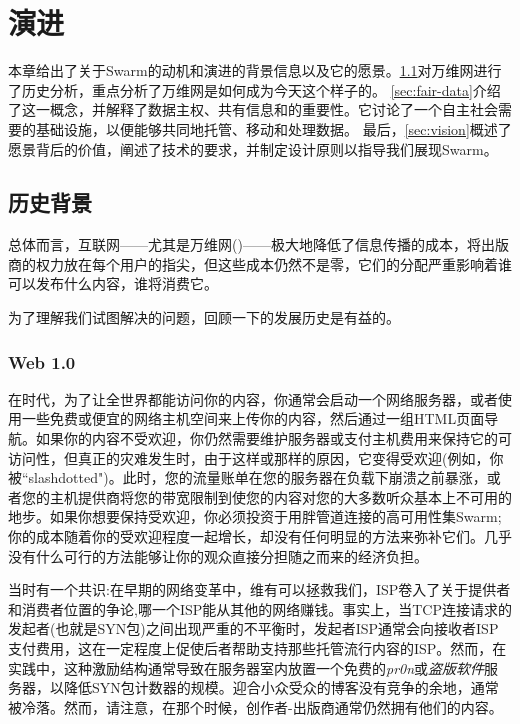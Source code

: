 \chapter{演进\statusgreen}\label{chap:vision}



本章给出了关于Swarm的动机和演进的背景信息以及它的愿景。\ref{sec:historical_context}对万维网进行了历史分析，重点分析了万维网是如何成为今天这个样子的。
\ref{sec:fair-data}介绍了这一概念，并解释了数据主权、共有信息和的重要性。它讨论了一个自主社会需要的基础设施，以便能够共同地托管、移动和处理数据。
最后，\ref{sec:vision}概述了愿景背后的价值，阐述了技术的要求，并制定设计原则以指导我们展现Swarm。

\section{历史背景\statusgreen}\label{sec:historical_context}
\green{}
总体而言，互联网——尤其是万维网()——极大地降低了信息传播的成本，将出版商的权力放在每个用户的指尖，但这些成本仍然不是零，它们的分配严重影响着谁可以发布什么内容，谁将消费它。

为了理解我们试图解决的问题，回顾一下的发展历史是有益的。

\subsection{Web 1.0 \statusgreen}\label{sec:web_1}

在时代，为了让全世界都能访问你的内容，你通常会启动一个网络服务器，或者使用一些免费或便宜的网络主机空间来上传你的内容，然后通过一组HTML页面导航。如果你的内容不受欢迎，你仍然需要维护服务器或支付主机费用来保持它的可访问性，但真正的灾难发生时，由于这样或那样的原因，它变得受欢迎(例如，你被“slashdotted")。此时，您的流量账单在您的服务器在负载下崩溃之前暴涨，或者您的主机提供商将您的带宽限制到使您的内容对您的大多数听众基本上不可用的地步。如果你想要保持受欢迎，你必须投资于用胖管道连接的高可用性集Swarm;你的成本随着你的受欢迎程度一起增长，却没有任何明显的方法来弥补它们。几乎没有什么可行的方法能够让你的观众直接分担随之而来的经济负担。

当时有一个共识:在早期的网络变革中，维有可以拯救我们，ISP卷入了关于提供者和消费者位置的争论,哪一个ISP能从其他的网络赚钱。事实上，当TCP连接请求的发起者(也就是SYN包)之间出现严重的不平衡时，发起者ISP通常会向接收者ISP支付费用，这在一定程度上促使后者帮助支持那些托管流行内容的ISP。然而，在实践中，这种激励结构通常导致在服务器室内放置一个免费的\emph{pr0n}或\emph{盗版软件}服务器，以降低SYN包计数器的规模。迎合小众受众的博客没有竞争的余地，通常被冷落。然而，请注意，在那个时候，创作者-出版商通常仍然拥有他们的内容。

